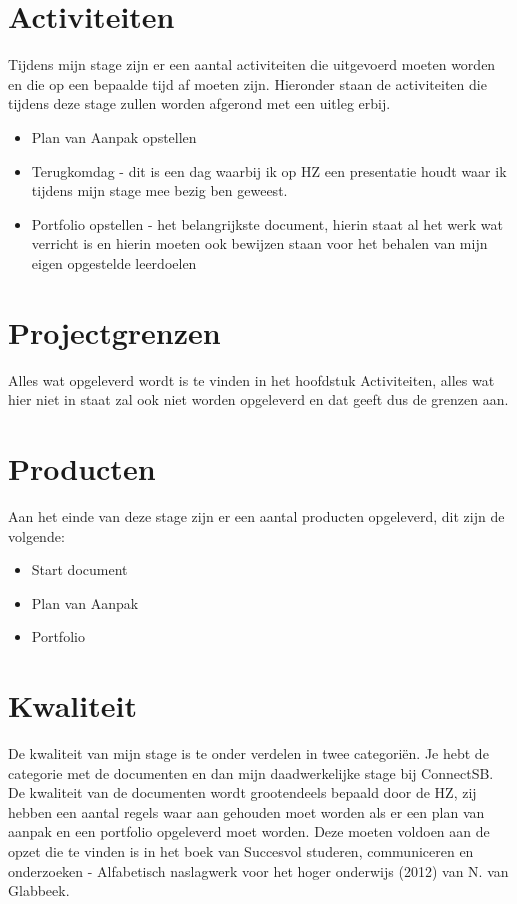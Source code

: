 \documentclass{article}
\begin{document}


\section{Activiteiten}
Tijdens mijn stage zijn er een aantal activiteiten die uitgevoerd moeten worden en die op een bepaalde tijd af moeten zijn.
Hieronder staan de activiteiten die tijdens deze stage zullen worden afgerond met een uitleg erbij.
\begin{itemize}
\item Plan van Aanpak opstellen
\item Terugkomdag - dit is een dag waarbij ik op HZ een presentatie houdt waar ik tijdens mijn stage mee bezig ben geweest.
\item Portfolio opstellen - het belangrijkste document, hierin staat al het werk wat verricht is en hierin moeten ook bewijzen staan voor het behalen van mijn eigen opgestelde leerdoelen
\end{itemize}



\section{Projectgrenzen}
Alles wat opgeleverd wordt is te vinden in het hoofdstuk Activiteiten, alles wat hier niet in staat zal ook niet worden opgeleverd en dat geeft dus de grenzen aan.



\section{Producten}
Aan het einde van deze stage zijn er een aantal producten opgeleverd, dit zijn de volgende:
\begin{itemize}
\item Start document
\item Plan van Aanpak
\item Portfolio
\end{itemize}



\section{Kwaliteit}
De kwaliteit van mijn stage is te onder verdelen in twee categoriën. Je hebt de categorie met de documenten en dan mijn daadwerkelijke stage bij ConnectSB. De kwaliteit van de documenten wordt grootendeels bepaald door de HZ, zij hebben een aantal regels waar aan gehouden moet worden als er een plan van aanpak en een portfolio opgeleverd moet worden. Deze moeten voldoen aan de opzet die te vinden is in het boek van Succesvol studeren, communiceren en onderzoeken - Alfabetisch naslagwerk voor het hoger onderwijs (2012) van N. van Glabbeek.
\end{document}
